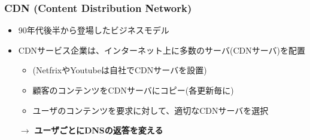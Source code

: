 \subsubsection{CDN (Content Distribution Network)}
\begin{itemize}
  \item 90年代後半から登場したビジネスモデル
  \item CDNサービス企業は、インターネット上に多数のサーバ(CDNサーバ)を配置
  \begin{itemize}
    \item (NetfrixやYoutubeは自社でCDNサーバを設置)
    \item 顧客のコンテンツをCDNサーバにコピー(各更新毎に)
    \item ユーザのコンテンツを要求に対して、適切なCDNサーバを選択
  \end{itemize}
  \item[$\rightarrow$] \textbf{ユーザごとにDNSの返答を変える}
\end{itemize}

